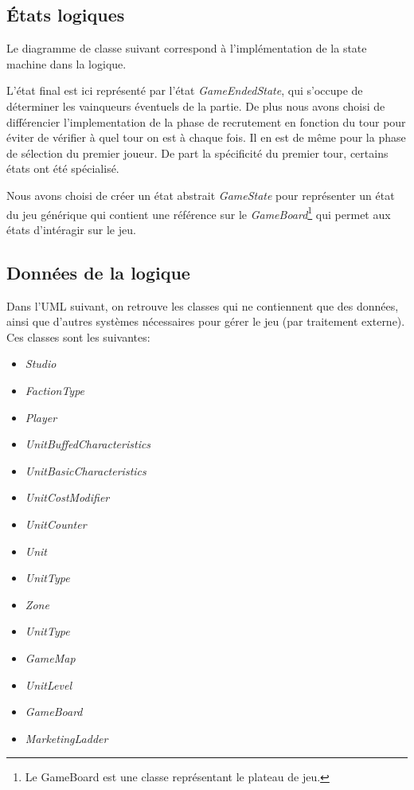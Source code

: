 \subsection{États logiques}

Le diagramme de classe suivant correspond à l'implémentation de la state machine
dans la logique.


L'état final est ici représenté par l'état \textit{GameEndedState}, qui s'occupe de
déterminer les vainqueurs éventuels de la partie.
De plus nous avons choisi de différencier l'implementation de la phase de
recrutement en fonction du tour pour éviter de vérifier à quel tour on est à chaque fois.
Il en est de même pour la phase de sélection du premier joueur. \newline
De part la spécificité du premier tour, certains états ont été spécialisé.

Nous avons choisi de créer un état abstrait \textit{GameState} pour
représenter un état du jeu générique qui contient une référence sur le
\textit{GameBoard}\footnote{Le GameBoard est une classe représentant le plateau de jeu.}
qui permet aux états d'intéragir sur le jeu.

\subsection{Données de la logique}

Dans l'UML suivant, on retrouve les classes qui ne contiennent que des données,
ainsi que d'autres systèmes nécessaires pour gérer le jeu (par traitement externe).
Ces classes sont les suivantes:
\begin{itemize}
    \item \textit{Studio}
    \item \textit{FactionType}
    \item \textit{Player}
    \item \textit{UnitBuffedCharacteristics}
    \item \textit{UnitBasicCharacteristics}
    \item \textit{UnitCostModifier}
    \item \textit{UnitCounter}
    \item \textit{Unit}
    \item \textit{UnitType}
    \item \textit{Zone}
    \item \textit{UnitType}
    \item \textit{GameMap}
    \item \textit{UnitLevel}
    \item \textit{GameBoard}
    \item \textit{MarketingLadder}
\end{itemize}

